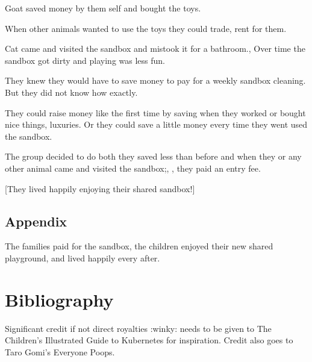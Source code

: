 \documentclass[draft, 12pt]{book}
\begin{document}
Goat saved money by them self and bought the toys.

When other animals wanted to use the toys they could {trade, rent} for them.

{Cat came and visited the sandbox and mistook it for a bathroom.,
Over time the sandbox got dirty and playing was less fun.}

They knew they would have to save money to pay for a weekly sandbox cleaning.
But they did not know how exactly.

They could raise money like the first time by saving when they worked or bought {nice things, luxuries}.
Or they could save a little money every time they went used the sandbox.

The group decided to do both they saved less than before and when they or any other animal came and visited the sandbox{;, ,} they paid an entry fee.

[They lived happily enjoying their shared sandbox!]

\pagebreak

\appendix
\section{Appendix}
The families paid for the sandbox, the children enjoyed their new shared playground, and lived happily every after.

\backmatter
\chapter{Bibliography}
Significant credit if not direct royalties :winky: needs to be given to The Children's Illustrated Guide to Kubernetes for inspiration.
Credit also goes to Taro Gomi's Everyone Poops.
\end{document}
